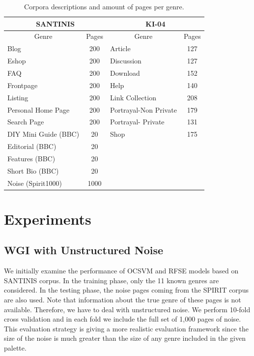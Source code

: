 \begin{table}
\center
\begin{tabular}{|l|l|l|l|}
\hline
\multicolumn{2}{|c|}{SANTINIS} & \multicolumn{2}{c|}{KI-04}\tabularnewline
\hline
\multicolumn{1}{|c|}{Genre} & \multicolumn{1}{c|}{Pages} & \multicolumn{1}{c|}{Genre} & \multicolumn{1}{c|}{Pages}\tabularnewline
\hline
\multicolumn{1}{|l|}{Blog} & \multicolumn{1}{c|}{200} & \multicolumn{1}{l|}{Article} & \multicolumn{1}{c|}{127}\tabularnewline
\multicolumn{1}{|l|}{Eshop} & \multicolumn{1}{c|}{200} & \multicolumn{1}{l|}{Discussion} & \multicolumn{1}{c|}{127}\tabularnewline
\multicolumn{1}{|l|}{FAQ} & \multicolumn{1}{c|}{200} & \multicolumn{1}{l|}{Download} & \multicolumn{1}{c|}{152}\tabularnewline
\multicolumn{1}{|l|}{Frontpage} & \multicolumn{1}{c|}{200} & \multicolumn{1}{l|}{Help} & \multicolumn{1}{c|}{140}\tabularnewline
\multicolumn{1}{|l|}{Listing} & \multicolumn{1}{c|}{200} & \multicolumn{1}{l|}{Link Collection} & \multicolumn{1}{c|}{208}\tabularnewline
\multicolumn{1}{|l|}{Personal Home Page} & \multicolumn{1}{c|}{200} & \multicolumn{1}{l|}{Portrayal-Non Private} & \multicolumn{1}{c|}{179}\tabularnewline
\multicolumn{1}{|l|}{Search Page} & \multicolumn{1}{c|}{200} & \multicolumn{1}{l|}{Portrayal- Private} & \multicolumn{1}{c|}{131}\tabularnewline
\multicolumn{1}{|l|}{DIY Mini Guide (BBC)} & \multicolumn{1}{c|}{20} & \multicolumn{1}{l|}{Shop} & \multicolumn{1}{c|}{175}\tabularnewline
\multicolumn{1}{|l|}{Editorial (BBC)} & \multicolumn{1}{c|}{20} &  & \tabularnewline
\multicolumn{1}{|l|}{Features (BBC)} & \multicolumn{1}{c|}{20} &  & \tabularnewline
\multicolumn{1}{|l|}{Short Bio (BBC)} & \multicolumn{1}{c|}{20} &  & \tabularnewline
\multicolumn{1}{|l|}{Noise (Spirit1000)} & \multicolumn{1}{c|}{1000} &  & \tabularnewline
\hline
\end{tabular}
\caption {Corpora descriptions and amount of pages per genre.}
\label{tbl:genre_tags}
\end{table}


\section{Experiments}\label{sec:Experiments_Results}
\subsection{WGI with Unstructured Noise}\label{sec:WGI_noise}

We initially examine the performance of OCSVM and RFSE models based on SANTINIS corpus. In the training phase, only the 11 known genres are considered. In the testing phase, the noise pages coming from the SPIRIT corpus are also used. Note that information about the true genre of these pages is not available. Therefore, we have to deal with unstructured noise. We perform  10-fold cross validation and in each fold we include the full set of 1,000 pages of noise. This evaluation strategy is giving a more realistic evaluation framework since the size of the noise is much greater than the size of any genre included in the given palette.

